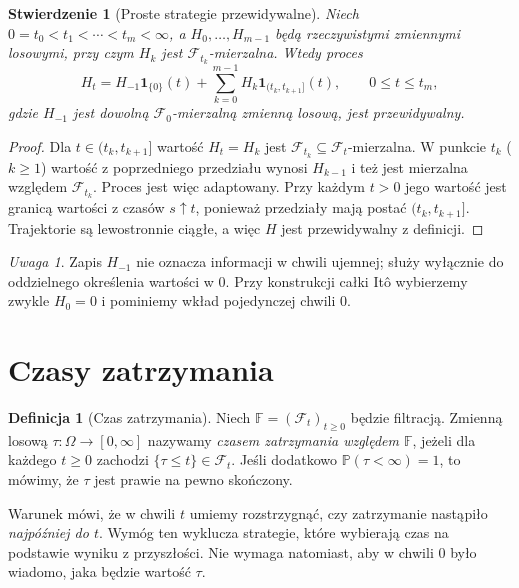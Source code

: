 \documentclass[11pt,a4paper,oneside]{report}
\numberwithin{equation}{chapter}
\theoremstyle{plain}
\newtheorem{stwierdzenie}[twierdzenie]{Stwierdzenie}
\theoremstyle{definition}
\newtheorem{definicja}{Definicja}[chapter]
\theoremstyle{remark}
\newtheorem{uwaga}{Uwaga}[chapter]
\newcommand{\Prob}{\mathbb{P}}
\newcommand{\calF}{\mathcal{F}}
\newcommand{\ind}[1]{\mathbf{1}_{#1}}
\begin{document}
\begin{stwierdzenie}[Proste strategie przewidywalne]
Niech $0=t_0<t_1<\cdots<t_m<\infty$, a
$H_0,\ldots,H_{m-1}$ będą rzeczywistymi zmiennymi
losowymi, przy czym $H_k$ jest $\calF_{t_k}$-mierzalna.
Wtedy proces
\[
H_t=H_{-1}\ind{\{0\}}(t)
+\sum_{k=0}^{m-1}H_k\ind{(t_k,t_{k+1}]}(t),
\qquad 0\le t\le t_m,
\]
gdzie $H_{-1}$ jest dowolną $\calF_0$-mierzalną
zmienną losową, jest przewidywalny.
\end{stwierdzenie}
\begin{proof}
Dla $t\in(t_k,t_{k+1}]$ wartość $H_t=H_k$ jest
$\calF_{t_k}\subseteq\calF_t$-mierzalna.
W punkcie $t_k$ ($k\ge1$) wartość z poprzedniego
przedziału wynosi $H_{k-1}$ i też jest mierzalna
względem $\calF_{t_k}$. Proces jest więc adaptowany.
Przy każdym $t>0$ jego wartość jest granicą wartości
z czasów $s\uparrow t$, ponieważ przedziały mają
postać $(t_k,t_{k+1}]$. Trajektorie są lewostronnie
ciągłe, a więc $H$ jest przewidywalny z definicji.
\end{proof}

\begin{uwaga}
Zapis $H_{-1}$ nie oznacza informacji w chwili ujemnej;
służy wyłącznie do oddzielnego określenia wartości w $0$.
Przy konstrukcji całki Itô wybierzemy zwykle $H_0=0$
i pominiemy wkład pojedynczej chwili $0$.
\end{uwaga}

\section{Czasy zatrzymania}
\begin{definicja}[Czas zatrzymania]
Niech $\mathbb F=(\calF_t)_{t\ge0}$ będzie filtracją.
Zmienną losową $\tau:\Omega\to[0,\infty]$
nazywamy \emph{czasem zatrzymania względem $\mathbb F$},
jeżeli dla każdego $t\ge0$ zachodzi
$\{\tau\le t\}\in\calF_t$.
Jeśli dodatkowo $\Prob(\tau<\infty)=1$, to
mówimy, że $\tau$ jest prawie na pewno skończony.
\end{definicja}

Warunek mówi, że w chwili $t$ umiemy rozstrzygnąć,
czy zatrzymanie nastąpiło \emph{najpóźniej do $t$}.
Wymóg ten wyklucza strategie, które wybierają czas
na podstawie wyniku z przyszłości. Nie wymaga natomiast,
aby w chwili $0$ było wiadomo, jaka będzie wartość $\tau$.
\end{document}
